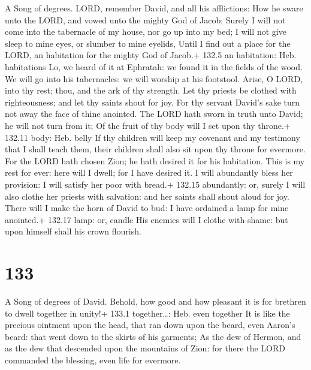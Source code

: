 A Song of degrees.  LORD, remember David, and all his
afflictions:  How he sware unto the LORD, and vowed unto the
mighty God of Jacob;  Surely I will not come into the
tabernacle of my house, nor go up into my bed;  I will not
give sleep to mine eyes, or slumber to mine eyelids,  Until
I find out a place for the LORD, an habitation for the mighty God of
Jacob.+ 132.5 an habitation: Heb. habitations  Lo, we heard
of it at Ephratah: we found it in the fields of the wood. 
We will go into his tabernacles: we will worship at his footstool.
 Arise, O LORD, into thy rest; thou, and the ark of thy
strength.  Let thy priests be clothed with righteousness;
and let thy saints shout for joy.  For thy servant David's
sake turn not away the face of thine anointed.  The LORD
hath sworn in truth unto David; he will not turn from it; Of the fruit
of thy body will I set upon thy throne.+ 132.11 body: Heb. belly
 If thy children will keep my covenant and my testimony
that I shall teach them, their children shall also sit upon thy throne
for evermore.  For the LORD hath chosen Zion; he hath
desired it for his habitation.  This is my rest for ever:
here will I dwell; for I have desired it.  I will
abundantly bless her provision: I will satisfy her poor with bread.+
132.15 abundantly: or, surely  I will also clothe her
priests with salvation: and her saints shall shout aloud for joy.
 There will I make the horn of David to bud: I have
ordained a lamp for mine anointed.+ 132.17 lamp: or, candle
 His enemies will I clothe with shame: but upon himself
shall his crown flourish.

\hypertarget{section-133}{%
\section{133}\label{section-133}}

A Song of degrees of David.  Behold, how good and how
pleasant it is for brethren to dwell together in unity!+ 133.1
together\ldots: Heb. even together  It is like the precious
ointment upon the head, that ran down upon the beard, even Aaron's
beard: that went down to the skirts of his garments;  As the
dew of Hermon, and as the dew that descended upon the mountains of Zion:
for there the LORD commanded the blessing, even life for evermore.


